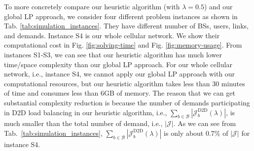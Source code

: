 To more concretely compare our heuristic algorithm (with $\lambda=0.5$) and our global LP approach,
we consider four different problem instances as shown in Tab. \ref{tab:simulation_instances}.
They have different number of BSs, users, links, and demands. Instance S4 is our whole cellular network.
We show their computational cost in Fig. \ref{fig:solving-time} and Fig. \ref{fig:memory-usage}.
From instances S1-S3, we can see that our heuristic algorithm has much lower time/space complexity than our global LP approach.
For our whole cellular network, i.e., instance S4, we cannot apply our global LP approach with our computational resources,
but our heuristic algorithm takes less than 30 minutes of time and consumes less than 6GB of memory.
The reason that we can get substantial complexity reduction is because the number of demands participating in
D2D load balancing in our heuristic algorithm, i.e.,  $\sum_{b\in\mathcal{B}}|\mathcal{J}^{\text{D2D}}_b(\lambda)|$,
is much smaller than the total number of demand, i.e., $|\mathcal{J}|$. As we can see from
Tab.~\ref{tab:simulation_instances}, $\sum_{b\in\mathcal{B}}|\mathcal{J}^{\text{D2D}}_b(\lambda)|$ is only about 0.7\% of $|\mathcal{J}|$
for instance S4.
%
%
%
%

